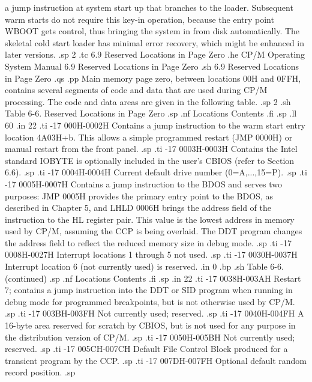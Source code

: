 a jump instruction at system start up that branches to the 
loader.  Subsequent warm starts do not require this key-in 
operation, because the entry point WBOOT gets control, thus bringing 
the system in from disk automatically.  The skeletal cold start 
loader has minimal error recovery, which might be enhanced in later 
versions.
.sp 2
.tc    6.9  Reserved Locations in Page Zero
.he CP/M Operating System Manual 6.9  Reserved Locations in Page Zero
.sh
6.9  Reserved Locations in Page Zero
.qs
.pp
Main memory page zero, between locations 00H and 0FFH, contains 
several segments of code and data that are used during CP/M 
processing.  The code and data areas are given in the following table.
.sp 2
.sh
           Table 6-6.  Reserved Locations in Page Zero 
.sp
.nf
     Locations                       Contents
.fi
.sp
.ll 60
.in 22
.ti -17
000H-0002H       Contains a jump instruction to the warm start entry location 
4A03H+b.  This allows a simple programmed restart (JMP 0000H) or manual 
restart from the front panel.
.sp
.ti -17
0003H-0003H      Contains the Intel standard IOBYTE is optionally 
included in the user's CBIOS (refer to Section 6.6).
.sp
.ti -17
0004H-0004H      Current default drive number (0=A,...,15=P).
.sp
.ti -17
0005H-0007H      Contains a jump instruction to the BDOS and serves two 
purposes:  JMP 0005H provides the primary entry point to the BDOS, as 
described in Chapter 5, and LHLD 0006H brings the address field of the 
instruction to the HL register pair.  This value is the lowest address in 
memory used by CP/M, assuming the CCP is being overlaid.  The DDT program 
changes the address field to reflect the reduced memory size in debug mode.
.sp
.ti -17
0008H-0027H      Interrupt locations 1 through 5 not used.
.sp
.ti -17
0030H-0037H      Interrupt location 6 (not currently used) is reserved.
.in 0
.bp
.sh
                     Table 6-6.  (continued)
.sp
.nf
     Locations                       Contents
.fi
.sp
.in 22
.ti -17 
0038H-003AH      Restart 7; contains a jump instruction into the DDT or SID 
program when running in debug mode for programmed breakpoints, but is not 
otherwise used by CP/M.
.sp
.ti -17
003BH-003FH      Not currently used; reserved.
.sp 
.ti -17
0040H-004FH      A 16-byte area reserved for scratch by CBIOS, but is not 
used for any purpose in the distribution version of CP/M.
.sp
.ti -17
0050H-005BH      Not currently used; reserved.
.sp
.ti -17
005CH-007CH      Default File Control Block produced for a transient 
program by the CCP.
.sp
.ti -17
007DH-007FH      Optional default random record position.
.sp
